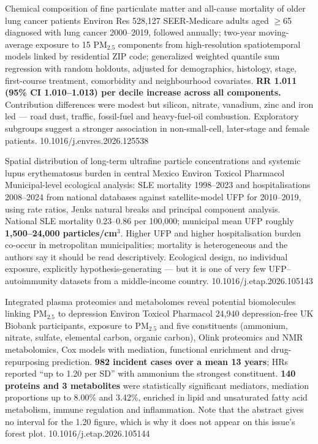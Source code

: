 \documentclass[10pt]{article}
\begin{document}

{Chemical composition of fine particulate matter and all-cause mortality of older lung cancer patients}
{Environ Res}
{528{,}127 SEER-Medicare adults aged $\geq$65 diagnosed with lung cancer 2000--2019,
followed annually; two-year moving-average exposure to 15 PM$_{2.5}$ components from
high-resolution spatiotemporal models linked by residential ZIP code; generalized
weighted quantile sum regression with random holdouts, adjusted for demographics,
histology, stage, first-course treatment, comorbidity and neighbourhood covariates.
\textbf{RR 1.011 (95\% CI 1.010--1.013) per decile increase across all components.}
Contribution differences were modest but silicon, nitrate, vanadium, zinc and iron led
--- road dust, traffic, fossil-fuel and heavy-fuel-oil combustion. Exploratory subgroups
suggest a stronger association in non-small-cell, later-stage and female patients.}
{10.1016/j.envres.2026.125538}

{Spatial distribution of long-term ultrafine particle concentrations and systemic lupus erythematosus burden in central Mexico}
{Environ Toxicol Pharmacol}
{Municipal-level ecological analysis: SLE mortality 1998--2023 and hospitalisations
2008--2024 from national databases against satellite-model UFP for 2010--2019, using rate
ratios, Jenks natural breaks and principal component analysis. National SLE mortality
0.23--0.86 per 100{,}000; municipal mean UFP roughly
\textbf{1{,}500--24{,}000 particles/cm$^3$}. Higher UFP and higher hospitalisation
burden co-occur in metropolitan municipalities; mortality is heterogeneous and the
authors say it should be read descriptively. Ecological design, no individual exposure,
explicitly hypothesis-generating --- but it is one of very few UFP--autoimmunity datasets
from a middle-income country.}
{10.1016/j.etap.2026.105143}


{Integrated plasma proteomics and metabolomes reveal potential biomolecules linking PM$_{2.5}$ to depression}
{Environ Toxicol Pharmacol}
{24{,}940 depression-free UK Biobank participants, exposure to PM$_{2.5}$ and five
constituents (ammonium, nitrate, sulfate, elemental carbon, organic carbon), Olink
proteomics and NMR metabolomics, Cox models with mediation, functional enrichment and
drug-repurposing prediction. \textbf{982 incident cases over a mean 13 years}; HRs
reported ``up to 1.20 per SD'' with ammonium the strongest constituent. \textbf{140
proteins and 3 metabolites} were statistically significant mediators, mediation
proportions up to 8.00\% and 3.42\%, enriched in lipid and unsaturated fatty acid
metabolism, immune regulation and inflammation. Note that the abstract gives no interval
for the 1.20 figure, which is why it does not appear on this issue's forest plot.}
{10.1016/j.etap.2026.105144}
\end{document}
